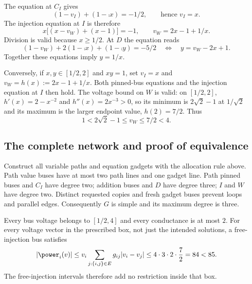 The equation at $C_I$ gives
\[
 (1-v_I)+(1-\comp{x})=-1/2,
 \qquad\text{hence }v_I=x.
\]
The injection equation at $I$ is therefore
\begin{equation}
 x\bigl[(x-v_W)+(x-1)\bigr]=-1,
 \qquad v_W=2x-1+1/x.
 \label{eq:inversion-I}
\end{equation}
Division is valid because $x\ge1/2$. At $D$ the equation reads
\begin{equation}
 (1-v_W)+2(1-\comp{x})+(1-\comp{y})=-5/2
 \quad\Longleftrightarrow\quad y=v_W-2x+1.
 \label{eq:inversion-D}
\end{equation}
Together these equations imply $y=1/x$.

Conversely, if $x,y\in[1/2,2]$ and $xy=1$, set $v_I=x$ and
$v_W=h(x):=2x-1+1/x$. Both pinned-bus equations and the injection equation
at $I$ then hold. The voltage bound on $W$ is valid: on $[1/2,2]$,
$h'(x)=2-x^{-2}$ and $h''(x)=2x^{-3}>0$, so its minimum is
$2\sqrt{2}-1$ at $1/\sqrt{2}$ and its maximum is the larger endpoint value,
$h(2)=7/2$. Thus
\begin{equation}
 1<2\sqrt{2}-1\le v_W\le7/2<4.
 \label{eq:W-range}
\end{equation}

\subsection{The complete network and proof of equivalence}

Construct all variable paths and equation gadgets with the allocation rule
above. Path value buses have at most two path lines and one gadget line.
Path pinned buses and $C_I$ have degree two; addition buses and $D$ have
degree three; $I$ and $W$ have degree two. Distinct requested copies and fresh
gadget buses prevent loops and parallel edges. Consequently $G$ is simple and
its maximum degree is three.

Every bus voltage belongs to $[1/2,4]$ and every conductance is at most $2$.
For every voltage vector in the prescribed box, not just the intended
solutions, a free-injection bus satisfies
\begin{equation}
 |\power_i(v)|
 \le v_i\sum_{j:\{i,j\}\in E}g_{ij}|v_i-v_j|
 \le 4\cdot3\cdot2\cdot\frac72=84<85.
 \label{eq:free-bound}
\end{equation}
The free-injection intervals therefore add no restriction inside that box.

